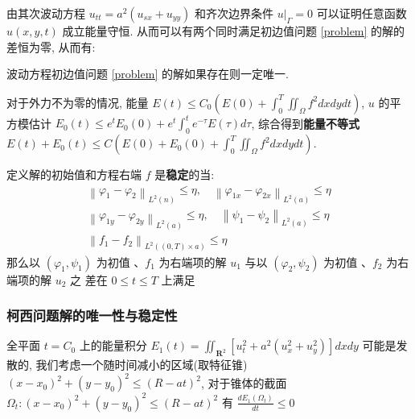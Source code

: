\documentclass[10pt]{yerbaformat}
\begin{document}
\par 由其次波动方程 $u_{t t}=a^{2}\left(u_{s x}+u_{y y}\right)$ 和齐次边界条件 $\left.u\right|_{\Gamma}=0$ 可以证明任意函数 $u(x, y, t)$ 成立能量守恒. 从而可以有两个同时满足初边值问题 \ref{problem} 的解的差恒为零, 从而有:

\begin{theorem}
    波动方程初边值问题 \ref{problem} 的解如果存在则一定唯一.
\end{theorem}

\par 对于外力不为零的情况, 能量 $E(t) \leqslant C_{0}\left(E(0)+\int_{0}^{T} \iint_{\Omega} f^{2} d x d y d t\right)$, $u$ 的平方模估计 $E_{0}(t) \leqslant e^{t} E_{0}(0)+e^{t} \int_{0}^{t} e^{-\tau} E(\tau) d \tau$, 综合得到\textbf{能量不等式} $E(t)+E_{0}(t) \leqslant C\left(E(0)+E_{0}(0)+\int_{0}^{T} \iint_{\Omega} f^{2} d x d y d t\right)$.

\begin{theorem}
    定义解的初始值和方程右端 $f$ 是\textbf{稳定}的当:
    $$
        \begin{array}{l}
            \left\|\varphi_{1}-\varphi_{2}\right\|_{L^{2}(n)} \leqslant \eta, \quad\left\|\varphi_{1 x}-\varphi_{2 x}\right\|_{L^{2}(a)} \leqslant \eta \\
            \left\|\varphi_{1 y}-\varphi_{2 y}\right\|_{L^{2}(a)} \leqslant \eta, \quad\left\|\psi_{1}-\psi_{2}\right\|_{L^{2}(a)} \leqslant \eta       \\
            \left\|f_{1}-f_{2}\right\|_{L^{2}((0, T) \times a)} \leqslant \eta
        \end{array}
    $$
    那么以 $\left(\varphi_{1}, \psi_{1}\right)$ 为初值 $、 f_{1}$ 为右端项的解 $u_{1}$ 与以 $\left(\varphi_{2}, \psi_{2}\right)$ 为初值 $、 f_{2}$ 为右端项的解 $u_{2}$ 之 差在 $0 \leqslant t \leqslant T$ 上满足
\end{theorem}

\subsubsection{柯西问题解的唯一性与稳定性}

\par 全平面 $t=C_0$ 上的能量积分 $E_{1}(t)=\iint_{\mathbf{R}^{2}}\left[u_{t}^{2}+a^{2}\left(u_{x}^{2}+u_{y}^{2}\right)\right] d x d y$ 可能是发散的, 我们考虑一个随时间减小的区域(取特征锥) $\left(x-x_{0}\right)^{2}+\left(y-y_{0}\right)^{2} \leqslant(R-a t)^{2}$, 对于锥体的截面 $\Omega_{t}:\left(x-x_{0}\right)^{2}+\left(y-y_{0}\right)^{2} \leqslant(R-a t)^{2}$ 有 $\frac{d E_{1}\left(\Omega_{t}\right)}{d t} \leqslant 0$
\end{document}
